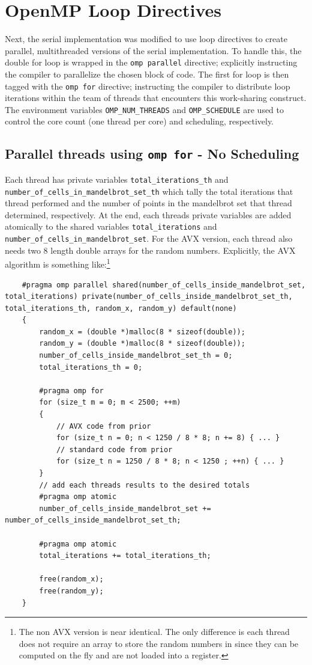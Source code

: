 \documentclass{article}
\begin{document}
\section{OpenMP Loop Directives}
Next, the serial implementation was modified to use loop directives to create parallel, 
multithreaded versions of the serial implementation. To handle this, the double 
for loop is wrapped in the \texttt{omp parallel} directive; explicitly instructing 
the compiler to parallelize the chosen block of code. The first for loop is then tagged 
with the \texttt{omp for} directive; instructing the compiler to distribute loop 
iterations within the team of threads that encounters this work-sharing construct. The environment variables 
\texttt{OMP\_NUM\_THREADS} and \texttt{OMP\_SCHEDULE} are used to control the core count (one thread per core) 
and scheduling, respectively.

\subsection{Parallel threads using \texttt{omp for} - No Scheduling}
Each thread has private variables \texttt{total\_iterations\_th} and \texttt{number\_of\_cells\_in\_mandelbrot\_set\_th} 
which tally the total iterations that thread performed and the number of points in the mandelbrot set that thread determined, respectively. 
At the end, each threads private variables are added atomically to the shared variables \texttt{total\_iterations} and \texttt{number\_of\_cells\_in\_mandelbrot\_set}. 
For the AVX version, each thread also needs two 8 length double arrays for the random numbers. Explicitly, the AVX algorithm is something like:\footnote{The non AVX version is 
near identical. The only difference is each thread does not require an array to store the random numbers in since they can be computed on the fly and are not loaded into a register.}
\begin{lstlisting}
    #pragma omp parallel shared(number_of_cells_inside_mandelbrot_set, total_iterations) private(number_of_cells_inside_mandelbrot_set_th, total_iterations_th, random_x, random_y) default(none)
    {
        random_x = (double *)malloc(8 * sizeof(double));
        random_y = (double *)malloc(8 * sizeof(double));
        number_of_cells_inside_mandelbrot_set_th = 0;
        total_iterations_th = 0;

        #pragma omp for
        for (size_t m = 0; m < 2500; ++m)
        {
            // AVX code from prior
            for (size_t n = 0; n < 1250 / 8 * 8; n += 8) { ... }
            // standard code from prior
            for (size_t n = 1250 / 8 * 8; n < 1250 ; ++n) { ... }
        }
        // add each threads results to the desired totals
        #pragma omp atomic
        number_of_cells_inside_mandelbrot_set += number_of_cells_inside_mandelbrot_set_th;

        #pragma omp atomic
        total_iterations += total_iterations_th;

        free(random_x);
        free(random_y);
    }
\end{lstlisting}
\end{document}
